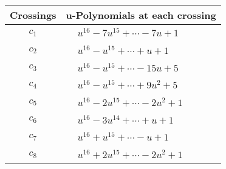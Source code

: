 \documentclass[1p]{elsarticle_modified}
\theoremstyle{definition}
\begin{document}
\begin{tabular}{m{50pt}|m{274pt}}
Crossings & \hspace{64pt}u-Polynomials at each crossing \\
\hline $$\begin{aligned}c_{1}\end{aligned}$$&$\begin{aligned}
&u^{16}-7 u^{15}+\cdots-7 u+1
\end{aligned}$\\
\hline $$\begin{aligned}c_{2}\end{aligned}$$&$\begin{aligned}
&u^{16}- u^{15}+\cdots+u+1
\end{aligned}$\\
\hline $$\begin{aligned}c_{3}\end{aligned}$$&$\begin{aligned}
&u^{16}- u^{15}+\cdots-15 u+5
\end{aligned}$\\
\hline $$\begin{aligned}c_{4}\end{aligned}$$&$\begin{aligned}
&u^{16}- u^{15}+\cdots+9 u^2+5
\end{aligned}$\\
\hline $$\begin{aligned}c_{5}\end{aligned}$$&$\begin{aligned}
&u^{16}-2 u^{15}+\cdots-2 u^2+1
\end{aligned}$\\
\hline $$\begin{aligned}c_{6}\end{aligned}$$&$\begin{aligned}
&u^{16}-3 u^{14}+\cdots+u+1
\end{aligned}$\\
\hline $$\begin{aligned}c_{7}\end{aligned}$$&$\begin{aligned}
&u^{16}+u^{15}+\cdots- u+1
\end{aligned}$\\
\hline $$\begin{aligned}c_{8}\end{aligned}$$&$\begin{aligned}
&u^{16}+2 u^{15}+\cdots-2 u^2+1
\end{aligned}$\\

\end{tabular}
\end{document}
